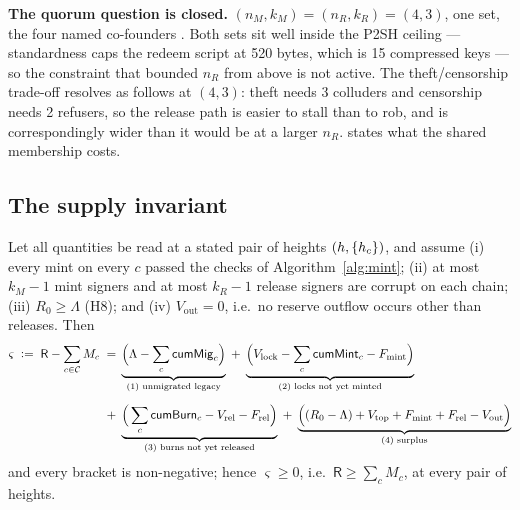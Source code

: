 \noindent\textbf{The quorum question is closed.} $(n_M, k_M) = (n_R, k_R) = (4,3)$, one set, the four
named co-founders . Both sets sit well inside the P2SH
ceiling --- standardness caps the redeem script at 520 bytes, which is 15 compressed keys
\srcinferred --- so the constraint that bounded $n_R$ from above is not active. The theft/censorship
trade-off resolves as follows at $(4,3)$: theft needs 3 colluders and censorship needs 2 refusers, so
the release path is easier to stall than to rob, and  is correspondingly wider than
it would be at a larger $n_R$.  states what the shared membership costs.

\subsection{The supply invariant}
\label{sec:bridging-invariant}

\begin{theorem}
\label{thm:reserve-dominance}
Let all quantities be read at a stated pair of heights $(h, \{h_c\})$, and assume
(i) every mint on every $c$ passed the checks of Algorithm~\ref{alg:mint};
(ii) at most $k_M - 1$ mint signers and at most $k_R - 1$ release signers are corrupt on each chain;
(iii) $R_0 \ge \Lambda$ (H8); and
(iv) $V_{\mathrm{out}} = 0$, i.e.\ no reserve outflow occurs other than releases.
Then
\begin{align*}
\varsigma \;\vcentcolon=\; \mathsf{R} - \sum_{c \in \mathcal{C}} M_c
\;=\;& \underbrace{\Big(\Lambda - \sum_c \mathsf{cumMig}_c\Big)}_{\text{(1) unmigrated legacy}}
\;+\; \underbrace{\Big(V_{\mathrm{lock}} - \sum_c \mathsf{cumMint}_c - F_{\mathrm{mint}}\Big)}_{\text{(2) locks not yet minted}} \\[0.6em]
{}+\;& \underbrace{\Big(\sum_c \mathsf{cumBurn}_c - V_{\mathrm{rel}} - F_{\mathrm{rel}}\Big)}_{\text{(3) burns not yet released}}
\;+\; \underbrace{\Big((R_0 - \Lambda) + V_{\mathrm{top}} + F_{\mathrm{mint}} + F_{\mathrm{rel}} - V_{\mathrm{out}}\Big)}_{\text{(4) surplus}}
\end{align*}
and every bracket is non-negative; hence $\varsigma \ge 0$, i.e.\ $\mathsf{R} \ge \sum_c M_c$, at
every pair of heights. \planned
\end{theorem}

